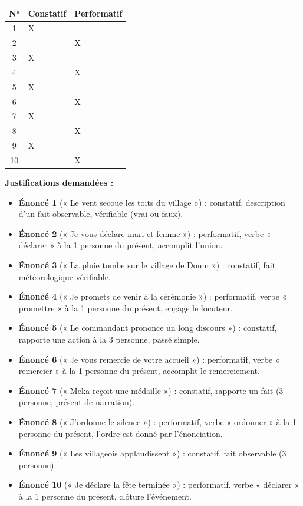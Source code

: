 \documentclass[11pt]{article}
\begin{document}
\begin{corrige}
\begin{center}
\begin{tabularx}{\linewidth}{|c|X|X|}\hline
\rowcolor{popblueL} \textbf{N°} & \textbf{Constatif} & \textbf{Performatif} \\ \hline
1 & X & \\ \hline
2 & & X \\ \hline
3 & X & \\ \hline
4 & & X \\ \hline
5 & X & \\ \hline
6 & & X \\ \hline
7 & X & \\ \hline
8 & & X \\ \hline
9 & X & \\ \hline
10 & & X \\ \hline
\end{tabularx}
\end{center}
\textbf{Justifications demandées :}
\begin{itemize}
\item \textbf{Énoncé 1} (« Le vent secoue les toits du village ») : constatif, description d'un fait observable, vérifiable (vrai ou faux).
\item \textbf{Énoncé 2} (« Je vous déclare mari et femme ») : performatif, verbe « déclarer » à la 1\iere{} personne du présent, accomplit l'union.
\item \textbf{Énoncé 3} (« La pluie tombe sur le village de Doum ») : constatif, fait météorologique vérifiable.
\item \textbf{Énoncé 4} (« Je promets de venir à la cérémonie ») : performatif, verbe « promettre » à la 1\iere{} personne du présent, engage le locuteur.
\item \textbf{Énoncé 5} (« Le commandant prononce un long discours ») : constatif, rapporte une action à la 3\ieme{} personne, passé simple.
\item \textbf{Énoncé 6} (« Je vous remercie de votre accueil ») : performatif, verbe « remercier » à la 1\iere{} personne du présent, accomplit le remerciement.
\item \textbf{Énoncé 7} (« Meka reçoit une médaille ») : constatif, rapporte un fait (3\ieme{} personne, présent de narration).
\item \textbf{Énoncé 8} (« J'ordonne le silence ») : performatif, verbe « ordonner » à la 1\iere{} personne du présent, l'ordre est donné par l'énonciation.
\item \textbf{Énoncé 9} (« Les villageois applaudissent ») : constatif, fait observable (3\ieme{} personne).
\item \textbf{Énoncé 10} (« Je déclare la fête terminée ») : performatif, verbe « déclarer » à la 1\iere{} personne du présent, clôture l'événement.
\end{itemize}
\end{corrige}
\end{document}
